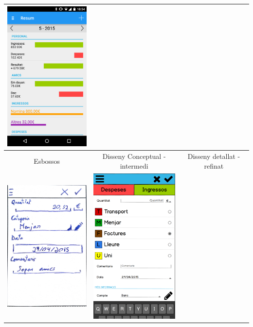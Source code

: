 \begin{table}
\begin{tabular}{| c | c | c |}
\includegraphics[width=50mm]{3_Dashboard.png} \\
\hline
Esbossos & Disseny Conceptual - intermedi & Disseny detallat - refinat \\
\includegraphics[width=50mm]{1_Add_expense.jpg} &
\includegraphics[width=50mm]{2_Add_expense.png} &

\end{tabular}
\end{table}
